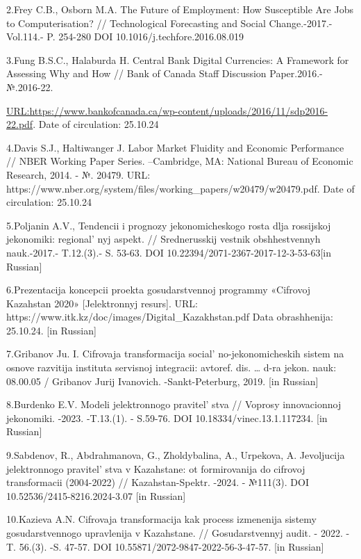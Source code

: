 {2.Frey C.B., Osborn M.A. The Future of Employment: How Susceptible Are
Jobs to Computerisation? // Technological Forecasting and Social
Change.-2017.-Vol.114.- P. 254-280 DOI 10.1016/j.techfore.2016.08.019

3.Fung B.S.C., Halaburda H. Central Bank Digital Currencies: A Framework
for Assessing Why and How // Bank of Canada Staff Discussion
Paper.2016.-№.2016-22.

\href{url:https://www.bankofcanada.ca/wp-content/uploads/2016/11/sdp2016-22.pdf}{URL:https://www.bankofcanada.ca/wp-content/uploads/2016/11/sdp2016-22.pdf}.
Date of circulation: 25.10.24

4.Davis S.J., Haltiwanger J. Labor Market Fluidity and Economic
Performance // NBER Working Paper Series. --Cambridge, MA: National
Bureau of Economic Research, 2014. - №. 20479. URL:
https://www.nber.org/system/files/working\_papers/w20479/w20479.pdf.
Date of circulation: 25.10.24

5.Poljanin A.V., Tendencii i prognozy jekonomicheskogo rosta dlja
rossijskoj jekonomiki: regional' nyj aspekt. //
Srednerusskij vestnik obshhestvennyh nauk.-2017.- T.12.(3).- S. 53-63.
DOI 10.22394/2071-2367-2017-12-3-53-63{[}in Russian{]}

6.Prezentacija koncepcii proekta gosudarstvennoj programmy «Cifrovoj
Kazahstan 2020» {[}Jelektronnyj resurs{]}. URL:
https://www.itk.kz/doc/images/Digital\_Kazakhstan.pdf Data obrashhenija:
25.10.24. {[}in Russian{]}

7.Gribanov Ju. I. Cifrovaja transformacija
social' no-jekonomicheskih sistem na osnove razvitija
instituta servisnoj integracii: avtoref. dis. \ldots{} d-ra jekon. nauk:
08.00.05 / Gribanov Jurij Ivanovich. -Sankt-Peterburg, 2019. {[}in
Russian{]}

8.Burdenko E.V. Modeli jelektronnogo pravitel' stva //
Voprosy innovacionnoj jekonomiki. -2023. -T.13.(1). - S.59-76. DOI
10.18334/vinec.13.1.117234. {[}in Russian{]}

9.Sabdenov, R., Abdrahmanova, G., Zholdybalina, A., Urpekova, A.
Jevoljucija jelektronnogo pravitel' stva v Kazahstane: ot
formirovanija do cifrovoj transformacii (2004-2022) // Kazahstan-Spektr.
-2024. - №111(3). DOI 10.52536/2415-8216.2024-3.07 {[}in Russian{]}

10.Kazieva A.N. Cifrovaja transformacija kak process izmenenija sistemy
gosudarstvennogo upravlenija v Kazahstane. // Gosudarstvennyj audit. -
2022. -T. 56.(3). -S. 47-57. DOI 10.55871/2072-9847-2022-56-3-47-57.
{[}in Russian{]}

}
